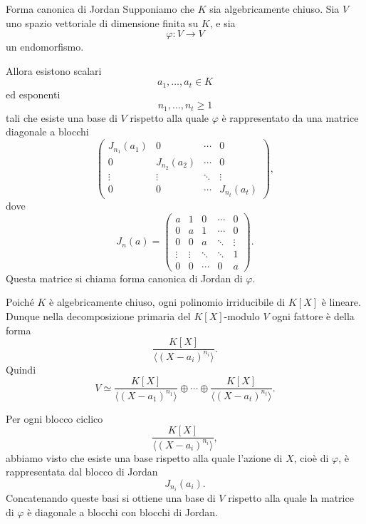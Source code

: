 \documentclass[a4paper]{article}
\begin{document}
\begin{radioactive}
\begin{snippettheorem}{Forma canonica di Jordan}
    Supponiamo che \(K\) sia algebricamente chiuso.
    Sia \(V\) uno spazio vettoriale di dimensione finita su \(K\), e sia
    \[
        \varphi\colon V\to V
    \]
    un endomorfismo.

    Allora esistono scalari
    \[
        a_1,\ldots,a_t\in K
    \]
    ed esponenti
    \[
        n_1,\ldots,n_t\geq 1
    \]
    tali che esiste una base di \(V\) rispetto alla quale \(\varphi\) è rappresentato da una matrice diagonale a blocchi
    \[
        \begin{pmatrix}
            J_{n_1}(a_1) & 0 & \cdots & 0\\
            0 & J_{n_2}(a_2) & \cdots & 0\\
            \vdots & \vdots & \ddots & \vdots\\
            0 & 0 & \cdots & J_{n_t}(a_t)
        \end{pmatrix},
    \]
    dove
    \[
        J_n(a)
        =
        \begin{pmatrix}
            a & 1 & 0 & \cdots & 0\\
            0 & a & 1 & \cdots & 0\\
            0 & 0 & a & \ddots & \vdots\\
            \vdots & \vdots & \ddots & \ddots & 1\\
            0 & 0 & \cdots & 0 & a
        \end{pmatrix}.
    \]
    Questa matrice si chiama forma canonica di Jordan di \(\varphi\).
\end{snippettheorem}
\end{radioactive}

\begin{radioactive}
\begin{snippetproof}{}
    Poiché \(K\) è algebricamente chiuso, ogni polinomio irriducibile di \(K[X]\) è lineare. Dunque nella decomposizione primaria del \(K[X]\)-modulo \(V\) ogni fattore è della forma
    \[
        \frac{K[X]}{\langle (X-a_i)^{n_i} \rangle}.
    \]
    Quindi
    \[
        V\simeq
        \frac{K[X]}{\langle (X-a_1)^{n_1} \rangle}
        \oplus
        \cdots
        \oplus
        \frac{K[X]}{\langle (X-a_t)^{n_t} \rangle}.
    \]

    Per ogni blocco ciclico
    \[
        \frac{K[X]}{\langle (X-a_i)^{n_i} \rangle},
    \]
    abbiamo visto che esiste una base rispetto alla quale l'azione di \(X\), cioè di \(\varphi\), è rappresentata dal blocco di Jordan
    \[
        J_{n_i}(a_i).
    \]
    Concatenando queste basi si ottiene una base di \(V\) rispetto alla quale la matrice di \(\varphi\) è diagonale a blocchi con blocchi di Jordan.
\end{snippetproof}
\end{radioactive}
\end{document}
